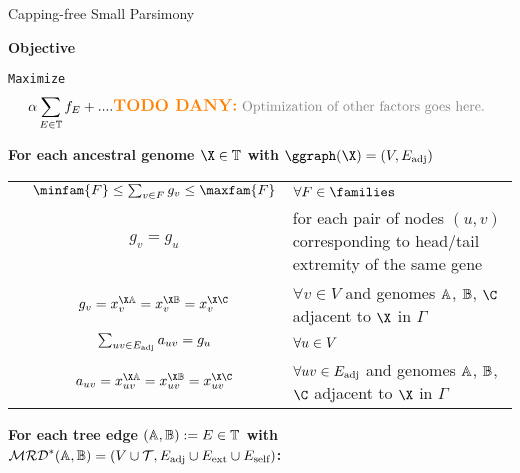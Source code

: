\documentclass[runningheads]{llncs}
\begin{document}
\begin{algorithm}
\caption{Capping-free Small Parsimony}
\textbf{Objective}

\newcommand{\idx}{\texttt{ix}}
\hspace{0.5cm}\texttt{Maximize}
\begin{equation*}
    \alpha \sum_{\edt\in\tree} f_\edt + .... \text{\todoDany{Optimization of other factors goes here.}}
\end{equation*}

\textbf{For each ancestral genome $\X \in \tree$ with $\ggraph(\X) = (\vertices, \adjacencyedges)$}

\begin{constraints}
\begin{tabular}{lcl}
    \cns & $\minfam{F} \leq \sum_{v \in F} g_v \leq \maxfam{F}$ & $\forall F \in \families$\\
    \cns & $g_v = g_u$ & for each pair of nodes $(u, v)$ corresponding to head/tail extremity of the same gene\todoDany{improve}\\
    \cns & $g_{v} = x^{\X\A}_{v} = x^{\X\B}_{v} = x^{\X\C}_{v}$& $\forall v \in V$ and genomes $\mathbb{A}$, $\mathbb{B}$, $\C$ adjacent to $\X$ in $\Gamma$\\
    \cns & $\sum_{uv \in E_\text{adj}} a_{uv} = g_u$ & $\forall u \in V$\\
    \cns & $a_{uv} = x^{\X\A}_{uv} = x^{\X\B}_{uv} = x^{\X\C}_{uv}$& $\forall uv \in E_\text{adj}$ and genomes $\mathbb{A}$, $\mathbb{B}$, $\C$ adjacent to $\X$ in $\Gamma$\\
\end{tabular}
\end{constraints}


\medskip
\textbf{For each tree edge $(\mathbb{A},\mathbb{B}):=E\in \mathbb{T}$ with $\mathcal{MRD}^*(\mathbb{A},\mathbb{B}) = (V\cup\mathcal{T}, E_\text{adj} \cup E_{\text{ext}} \cup E_\text{self})$:}


\end{algorithm}
\end{document}

